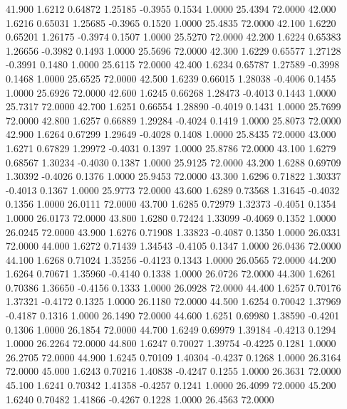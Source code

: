   41.900   1.6212   0.64872   1.25185  -0.3955   0.1534   1.0000  25.4394  72.0000
  42.000   1.6216   0.65031   1.25685  -0.3965   0.1520   1.0000  25.4835  72.0000
  42.100   1.6220   0.65201   1.26175  -0.3974   0.1507   1.0000  25.5270  72.0000
  42.200   1.6224   0.65383   1.26656  -0.3982   0.1493   1.0000  25.5696  72.0000
  42.300   1.6229   0.65577   1.27128  -0.3991   0.1480   1.0000  25.6115  72.0000
  42.400   1.6234   0.65787   1.27589  -0.3998   0.1468   1.0000  25.6525  72.0000
  42.500   1.6239   0.66015   1.28038  -0.4006   0.1455   1.0000  25.6926  72.0000
  42.600   1.6245   0.66268   1.28473  -0.4013   0.1443   1.0000  25.7317  72.0000
  42.700   1.6251   0.66554   1.28890  -0.4019   0.1431   1.0000  25.7699  72.0000
  42.800   1.6257   0.66889   1.29284  -0.4024   0.1419   1.0000  25.8073  72.0000
  42.900   1.6264   0.67299   1.29649  -0.4028   0.1408   1.0000  25.8435  72.0000
  43.000   1.6271   0.67829   1.29972  -0.4031   0.1397   1.0000  25.8786  72.0000
  43.100   1.6279   0.68567   1.30234  -0.4030   0.1387   1.0000  25.9125  72.0000
  43.200   1.6288   0.69709   1.30392  -0.4026   0.1376   1.0000  25.9453  72.0000
  43.300   1.6296   0.71822   1.30337  -0.4013   0.1367   1.0000  25.9773  72.0000
  43.600   1.6289   0.73568   1.31645  -0.4032   0.1356   1.0000  26.0111  72.0000
  43.700   1.6285   0.72979   1.32373  -0.4051   0.1354   1.0000  26.0173  72.0000
  43.800   1.6280   0.72424   1.33099  -0.4069   0.1352   1.0000  26.0245  72.0000
  43.900   1.6276   0.71908   1.33823  -0.4087   0.1350   1.0000  26.0331  72.0000
  44.000   1.6272   0.71439   1.34543  -0.4105   0.1347   1.0000  26.0436  72.0000
  44.100   1.6268   0.71024   1.35256  -0.4123   0.1343   1.0000  26.0565  72.0000
  44.200   1.6264   0.70671   1.35960  -0.4140   0.1338   1.0000  26.0726  72.0000
  44.300   1.6261   0.70386   1.36650  -0.4156   0.1333   1.0000  26.0928  72.0000
  44.400   1.6257   0.70176   1.37321  -0.4172   0.1325   1.0000  26.1180  72.0000
  44.500   1.6254   0.70042   1.37969  -0.4187   0.1316   1.0000  26.1490  72.0000
  44.600   1.6251   0.69980   1.38590  -0.4201   0.1306   1.0000  26.1854  72.0000
  44.700   1.6249   0.69979   1.39184  -0.4213   0.1294   1.0000  26.2264  72.0000
  44.800   1.6247   0.70027   1.39754  -0.4225   0.1281   1.0000  26.2705  72.0000
  44.900   1.6245   0.70109   1.40304  -0.4237   0.1268   1.0000  26.3164  72.0000
  45.000   1.6243   0.70216   1.40838  -0.4247   0.1255   1.0000  26.3631  72.0000
  45.100   1.6241   0.70342   1.41358  -0.4257   0.1241   1.0000  26.4099  72.0000
  45.200   1.6240   0.70482   1.41866  -0.4267   0.1228   1.0000  26.4563  72.0000
